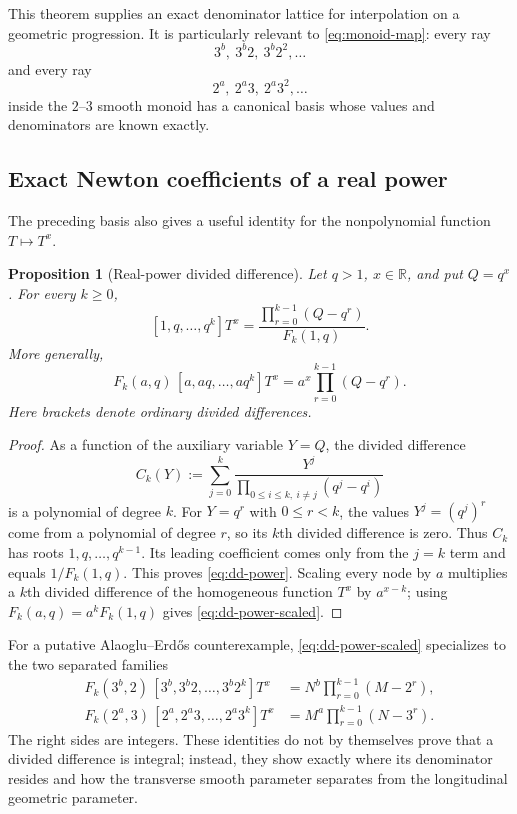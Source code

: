 \documentclass[11pt]{article}
\newtheorem{proposition}[theorem]{Proposition}
\theoremstyle{definition}
\theoremstyle{remark}
\newcommand{\R}{\mathbb R}
\newcommand{\AEname}{Alaoglu--Erd\H{o}s}
\begin{document}
This theorem supplies an exact denominator lattice for interpolation on a
geometric progression.  It is particularly relevant to \eqref{eq:monoid-map}:
every ray
\[
 3^b,\ 3^b2,\ 3^b2^2,\ldots
\]
and every ray
\[
 2^a,\ 2^a3,\ 2^a3^2,\ldots
\]
inside the $2$--$3$ smooth monoid has a canonical basis whose values and
denominators are known exactly.

\subsection{Exact Newton coefficients of a real power}

The preceding basis also gives a useful identity for the nonpolynomial
function $T\mapsto T^x$.

\begin{proposition}[Real-power divided difference]\label{prop:real-power-dd}
Let $q>1$, $x\in\R$, and put $Q=q^x$.  For every $k\geq0$,
\begin{equation}\label{eq:dd-power}
 [1,q,\ldots,q^k]T^x
 =\frac{\prod_{r=0}^{k-1}(Q-q^r)}{F_k(1,q)}.
\end{equation}
More generally,
\begin{equation}\label{eq:dd-power-scaled}
 F_k(a,q)\,[a,aq,\ldots,aq^k]T^x
 =a^x\prod_{r=0}^{k-1}(Q-q^r).
\end{equation}
Here brackets denote ordinary divided differences.
\end{proposition}

\begin{proof}
As a function of the auxiliary variable $Y=Q$, the divided difference
\[
 C_k(Y):=\sum_{j=0}^{k}\frac{Y^j}
 {\prod_{0\leq i\leq k,\ i\neq j}(q^j-q^i)}
\]
is a polynomial of degree $k$.  For $Y=q^r$ with $0\leq r<k$, the values
$Y^j=(q^j)^r$ come from a polynomial of degree $r$, so its $k$th divided
difference is zero.  Thus $C_k$ has roots $1,q,\ldots,q^{k-1}$.  Its leading
coefficient comes only from the $j=k$ term and equals $1/F_k(1,q)$.  This
proves \eqref{eq:dd-power}.  Scaling every node by $a$ multiplies a $k$th
divided difference of the homogeneous function $T^x$ by $a^{x-k}$; using
$F_k(a,q)=a^kF_k(1,q)$ gives \eqref{eq:dd-power-scaled}.
\end{proof}

For a putative \AEname{} counterexample, \eqref{eq:dd-power-scaled} specializes
to the two separated families
\begin{align}
 F_k(3^b,2)\,[3^b,3^b2,\ldots,3^b2^k]T^x
   &=N^b\prod_{r=0}^{k-1}(M-2^r),\label{eq:ray2}\\
 F_k(2^a,3)\,[2^a,2^a3,\ldots,2^a3^k]T^x
   &=M^a\prod_{r=0}^{k-1}(N-3^r).\label{eq:ray3}
\end{align}
The right sides are integers.  These identities do not by themselves prove
that a divided difference is integral; instead, they show exactly where its
denominator resides and how the transverse smooth parameter separates from
the longitudinal geometric parameter.
\end{document}
